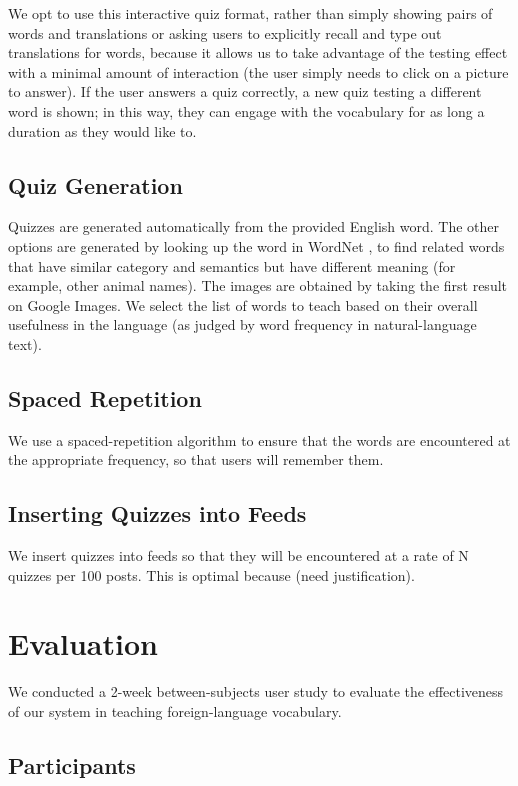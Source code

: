 \documentclass{chi-ext}
\begin{document}
We opt to use this interactive quiz format, rather than simply showing pairs of words and translations or asking users to explicitly recall and type out translations for words, because it allows us to take advantage of the testing effect with a minimal amount of interaction (the user simply needs to click on a picture to answer). If the user answers a quiz correctly, a new quiz testing a different word is shown; in this way, they can engage with the vocabulary for as long a duration as they would like to.

\subsection{Quiz Generation}

Quizzes are generated automatically from the provided English word. The other options are generated by looking up the word in WordNet \cite{wordnet}, to find related words that have similar category and semantics but have different meaning (for example, other animal names). The images are obtained by taking the first result on Google Images. We select the list of words to teach based on their overall usefulness in the language (as judged by word frequency in natural-language text).

\subsection{Spaced Repetition}

We use a spaced-repetition algorithm to ensure that the words are encountered at the appropriate frequency, so that users will remember them.

\subsection{Inserting Quizzes into Feeds}

We insert quizzes into feeds so that they will be encountered at a rate of N quizzes per 100 posts. This is optimal because (need justification).

\section{Evaluation}

We conducted a 2-week between-subjects user study to evaluate the effectiveness of our system in teaching foreign-language vocabulary.

\subsection{Participants}
\end{document}
